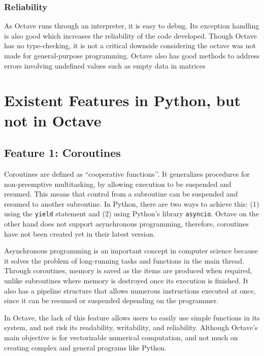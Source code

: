\documentclass{article}
\begin{document}
\subsubsection*{Reliability}
\par
As Octave runs through an interpreter, it is easy to debug. Its exception handling is also good which increases the reliability of the code developed. Though Octave has no type-checking, it is not a critical downside considering the octave was not made for general-purpose programming. Octave also has good methods to address errors involving undefined values such as empty data in matrices


\section*{Existent Features in Python, but not in Octave}
\subsection*{Feature 1: Coroutines}
\par
 Coroutines are defined as “cooperative functions’’. It generalizes procedures for non-preemptive multitasking, by allowing execution to be suspended and resumed. This means that control from a subroutine can be suspended and resumed to another subroutine. In Python, there are two ways to achieve this: (1) using the \texttt{yield} statement and (2)  using Python’s library \texttt{asyncio}. Octave on the other hand does not support asynchronous programming, therefore, coroutines have not been created yet in their latest version.

\par
Asynchronous programming is an important concept in computer science because it solves the problem of long-running tasks and functions in the main thread. Through coroutines, memory is saved as the items are produced when required, unlike subroutines where memory is destroyed once its execution is finished. It also has a pipeline structure that allows numerous instructions executed at once, since it can be resumed or suspended depending on the programmer.

\par
In Octave, the lack of this feature allows users to easily use simple functions in its system, and not risk its readability, writability, and reliability. Although Octave’s main objective is for vectorizable numerical computation, and not much on creating complex and general programs like Python.
\end{document}
